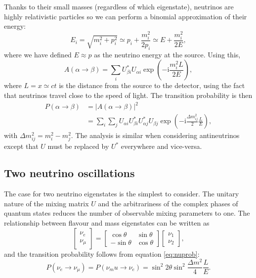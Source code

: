 \documentclass[10pt, a4paper]{article}
\newcommand{\mi}{\mathrm{i}}
\begin{document}
Thanks to their small masses (regardless of which eigenstate),
neutrinos are highly relativistic particles so we can perform a binomial
approximation of their energy:
$$ E_i = \sqrt{m_i^2 + p_i^2} \simeq p_i + \frac{m_i^2}{2 p_i} \simeq E +
\frac{m_i^2}{2E},$$
where we have defined $E \approx p$ as the neutrino energy at the source. Using
this,
$$A(\alpha \rightarrow \beta) = \sum_i
U^*_{\beta i} U_{\alpha i} \exp(-\mi \frac{m_i^2 L}{2E}),$$
where $L = x \simeq c t$ is the distance from the source to the detector, using the
fact that neutrinos travel close to the speed of light.
The transition probability is then
\begin{align}
	\label{eq:nuprob}
	P(\alpha \rightarrow \beta) &= |A(\alpha \rightarrow \beta)|^2 \nonumber\\
	&= \sum_i \sum_j U_{\alpha i} U^*_{\beta i} U^*_{\alpha j} U_{\beta j}
	\exp(-\mi \frac{\Delta m_{ij}^2}{2} \frac{L}{E}),
\end{align}
with $\Delta m^2_{ij} = m^2_i - m^2_j$.
The analysis is similar when considering antineutrinos except that $U$ must be
replaced by $U^*$ everywhere and vice-versa.



\subsection{Two neutrino oscillations} 
The case for two neutrino eigenstates is the simplest to consider. The
unitary nature of the mixing matrix $U$ and the arbitrariness of the complex phases
of quantum states reduces the number of observable mixing parameters to one.
The relationship between flavour and mass eigenstates can be written as 
\begin{equation}
	\begin{bmatrix} \nu_e \\ \nu_\mu \end{bmatrix} =
	\begin{bmatrix} \cos\theta & \sin\theta \\
								 -\sin\theta & \cos\theta \end{bmatrix}
	\begin{bmatrix} \nu_1 \\ \nu_2 \end{bmatrix},
\end{equation}
and the transition probability follows from equation \ref{eq:nuprob}:
	$$P(\nu_e \rightarrow \nu_\mu) = P(\nu_mu \rightarrow \nu_e) = \sin^2 2\theta
	\sin^2 \frac{\Delta m^2}{4} \frac{L}{E}.$$
\end{document}
